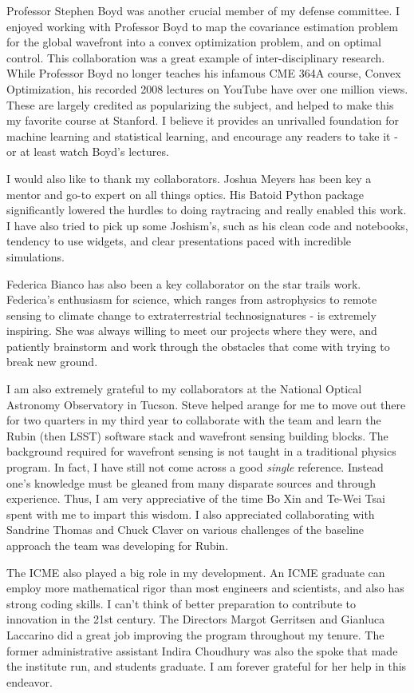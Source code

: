 Professor Stephen Boyd was another crucial member of my defense committee. I enjoyed working with Professor Boyd to map the covariance estimation problem for the global wavefront into a convex optimization problem, and on optimal control. This collaboration was a great example of inter-disciplinary research. While Professor Boyd no longer teaches his infamous CME 364A course, Convex Optimization, his recorded 2008 lectures on YouTube have over one million views. These are largely credited as popularizing the subject, and helped to make this my favorite course at Stanford. I believe it provides an unrivalled foundation for machine learning and statistical learning, and encourage any readers to take it - or at least watch Boyd's lectures. 

I would also like to thank my collaborators. Joshua Meyers has been key a mentor and go-to expert on all things optics. His Batoid Python package significantly lowered the hurdles to doing raytracing and really enabled this work. I have also tried to pick up some Joshism's, such as his clean code and notebooks, tendency to use widgets, and clear presentations paced with incredible simulations. 

Federica Bianco has also been a key collaborator on the star trails work. Federica's enthusiasm for science, which ranges from astrophysics to remote sensing to climate change to extraterrestrial technosignatures - is extremely inspiring. She was always willing to meet our projects where they were, and patiently brainstorm and work through the obstacles that come with trying to break new ground. 

I am also extremely grateful to my collaborators at the National Optical Astronomy Observatory in Tucson. Steve helped arange for me to move out there for two quarters in my third year to collaborate with the team and learn the Rubin (then LSST) software stack and wavefront sensing building blocks. The background required for wavefront sensing is not taught in a traditional physics program. In fact, I have still not come across a good \textit{single} reference. Instead one's knowledge must be gleaned from many disparate sources and through experience. Thus, I am very appreciative of the time Bo Xin and Te-Wei Tsai spent with me to impart this wisdom. I also appreciated collaborating with Sandrine Thomas and Chuck Claver on various challenges of the baseline approach the team was developing for Rubin. 

The ICME also played a big role in my development. An ICME graduate can employ more mathematical rigor than most engineers and scientists, and also has strong coding skills. I can't think of better preparation to contribute to innovation in the 21st century. The Directors Margot Gerritsen and Gianluca Laccarino did a great job improving the program throughout my tenure. The former administrative assistant Indira Choudhury was also the spoke that made the institute run, and students graduate. I am forever grateful for her help in this endeavor. 

